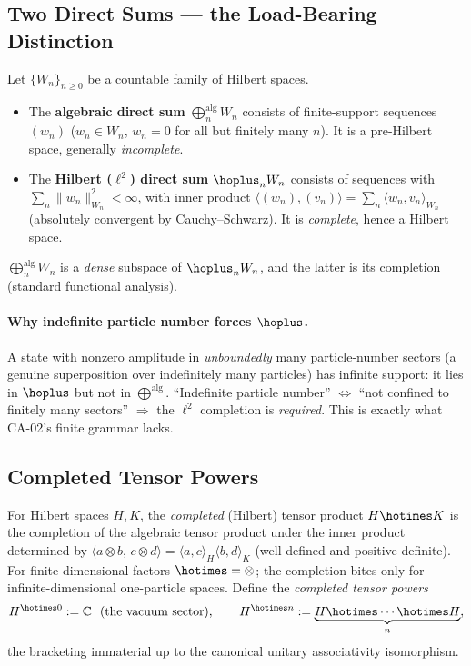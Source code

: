 \subsection{Two Direct Sums --- the Load-Bearing Distinction}

Let $\{W_n\}_{n\ge 0}$ be a countable family of Hilbert spaces.
\begin{itemize}
  \item The \textbf{algebraic direct sum} $\bigoplus^{\mathrm{alg}}_{n}W_n$ consists
  of finite-support sequences $(w_n)$ ($w_n\in W_n$, $w_n=0$ for all but finitely
  many $n$). It is a pre-Hilbert space, generally \emph{incomplete}.
  \item The \textbf{Hilbert ($\ell^2$) direct sum} $\hoplus_{n}W_n$ consists of
  sequences with $\sum_n\|w_n\|_{W_n}^2<\infty$, with inner product
  $\langle (w_n),(v_n)\rangle=\sum_n\langle w_n,v_n\rangle_{W_n}$ (absolutely
  convergent by Cauchy--Schwarz). It is \emph{complete}, hence a Hilbert space.
\end{itemize}
$\bigoplus^{\mathrm{alg}}_{n}W_n$ is a \emph{dense} subspace of $\hoplus_{n}W_n$,
and the latter is its completion (standard functional analysis).

\paragraph{Why indefinite particle number forces $\hoplus$.}
A state with nonzero amplitude in \emph{unboundedly} many particle-number sectors
(a genuine superposition over indefinitely many particles) has infinite support: it
lies in $\hoplus$ but not in $\bigoplus^{\mathrm{alg}}$. ``Indefinite particle
number'' $\Leftrightarrow$ ``not confined to finitely many sectors''
$\Rightarrow$ the $\ell^2$ completion is \emph{required}. This is exactly what
CA-02's finite grammar lacks.

\subsection{Completed Tensor Powers}

For Hilbert spaces $H,K$, the \emph{completed} (Hilbert) tensor product
$H\hotimes K$ is the completion of the algebraic tensor product under the inner
product determined by $\langle a\otimes b,\,c\otimes d\rangle
=\langle a,c\rangle_H\langle b,d\rangle_K$ (well defined and positive definite).
For finite-dimensional factors $\hotimes=\otimes$; the completion bites only for
infinite-dimensional one-particle spaces. Define the \emph{completed tensor powers}
\[
  H^{\hotimes 0} := \mathbb C\ \ (\text{the vacuum sector}),
  \qquad
  H^{\hotimes n} := \underbrace{H\hotimes\cdots\hotimes H}_{n},
\]
the bracketing immaterial up to the canonical unitary associativity isomorphism.

